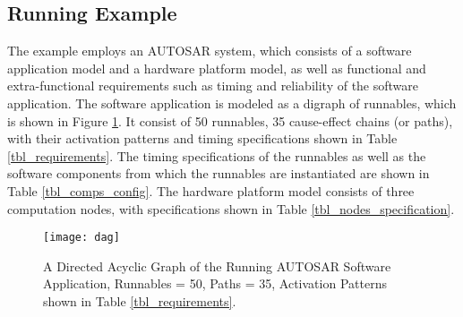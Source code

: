 \subsection{Running Example}
The example employs an AUTOSAR system, which consists of a software application model and a hardware platform model, as well as functional and extra-functional requirements such as timing and reliability of the software application. The software application is modeled as a digraph of runnables, which is shown in Figure \ref{fig_application}. It consist of 50 runnables, 35 cause-effect chains (or paths), with their activation patterns and timing specifications shown in Table \ref{tbl_requirements}. The timing specifications of the runnables as well as the software components from which the runnables are instantiated are shown in Table \ref{tbl_comps_config}. The hardware platform model consists of three computation nodes, with specifications shown in Table \ref{tbl_nodes_specification}.
\begin{figure}[t!]
\centering
\texttt{[image: dag]}
\caption{A Directed Acyclic Graph of the Running AUTOSAR Software Application, Runnables = 50, Paths = 35, Activation Patterns shown in Table \ref{tbl_requirements}.}
\label{fig_application}
\end{figure}
